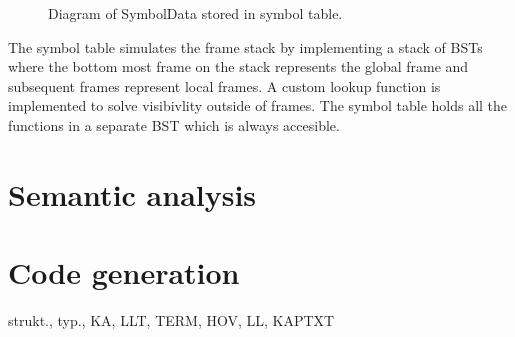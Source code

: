 \documentclass[11pt]{article}
\begin{document}
\begin{figure}[h]
	\centering
	
	\caption{Diagram of SymbolData stored in symbol table.}
	\label{fig:symboldata}
\end{figure}

The symbol table simulates the frame stack by implementing a stack of BSTs where the bottom most frame on the stack represents the global frame and subsequent frames represent local frames. A custom lookup function is implemented to solve visibivlity outside of frames. The symbol table holds all the functions in a separate BST which is always accesible.


\section{Semantic analysis}



\section{Code generation}





strukt., typ., KA, LLT, TERM, HOV, LL, KAPTXT




\newpage


\end{document}
